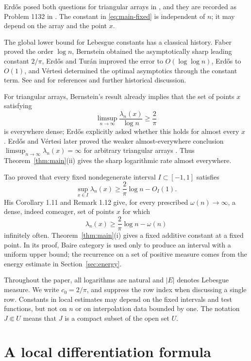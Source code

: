 \documentclass[11pt]{article}
\numberwithin{equation}{section}
\begin{document}
Erd\H{o}s posed both questions for triangular arrays in
\cite[p.~68]{Erdos}, and they are recorded as Problem 1132 in
\cite{Bloom}. The constant in \eqref{eq:main-fixed} is independent of
\(n\); it may depend on the array and the point \(x\).

The global lower bound for Lebesgue constants has a classical history.
Faber proved the order \(\log n\), Bernstein obtained the asymptotically
sharp leading constant \(2/\pi\), Erd\H{o}s and Tur\'an improved the error to
\(O(\log\log n)\), Erd\H{o}s to \(O(1)\), and V\'ertesi determined the
optimal asymptotics through the constant term. See
\cite[Section~1.3]{Tao} and \cite{Brutman} for references and further
historical discussion.

For triangular arrays, Bernstein's result already implies that the set of
points \(x\) satisfying
\[
 \limsup_{n\to\infty}\frac{\lambda_n(x)}{\log n}\ge\frac2\pi
\]
is everywhere dense; Erd\H{o}s explicitly asked whether this holds for
almost every \(x\) \cite[p.~68]{Erdos}. Erd\H{o}s and V\'ertesi later proved
the weaker almost-everywhere conclusion
\(\limsup_{n\to\infty}\lambda_n(x)=\infty\) for arbitrary triangular
arrays \cite{ErdosVertesi}. Thus Theorem~\ref{thm:main}(ii) gives the sharp
logarithmic rate almost everywhere.

Tao \cite[Theorem 1.10(i)]{Tao} proved that every fixed nondegenerate
interval \(I\subset[-1,1]\) satisfies
\[
 \sup_{x\in I}\lambda_n(x)\ge\frac2\pi\log n-O_I(1).
\]
His Corollary 1.11 and Remark 1.12 give, for every prescribed
\(\omega(n)\to\infty\), a dense, indeed comeager, set of points
\(x\) for which
\[
 \lambda_n(x)\ge\frac2\pi\log n-\omega(n)
\]
infinitely often. Theorem~\ref{thm:main}(i) gives a fixed additive
constant at a fixed point. In its proof, Baire category is used only to
produce an interval with a uniform upper bound; the recurrence on a set of
positive measure comes from the energy estimate in Section~\ref{sec:energy}.

Throughout the paper, all logarithms are natural and \(|E|\) denotes
Lebesgue measure. We write \(c_0=2/\pi\), and suppress the row index
when discussing a single row. Constants in local estimates may depend
on the fixed intervals and test functions, but not on \(n\) or on
interpolation data bounded by one. The notation \(J\Subset U\) means
that \(J\) is a compact subset of the open set \(U\).

\section{A local differentiation formula}
\label{sec:local}
\end{document}
